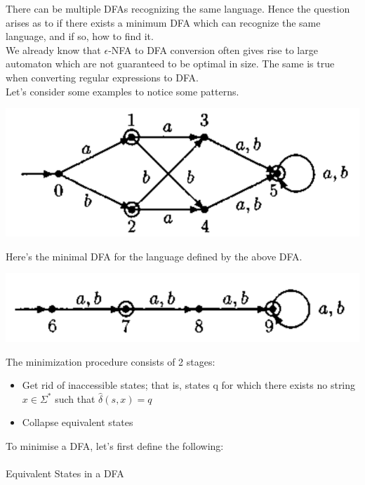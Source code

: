 \documentclass{report}
\newcommand{\dhat}{\hat{\delta}}
\begin{document}
There can be multiple DFAs recognizing the same language. Hence the question arises as to if there exists a minimum DFA which can recognize the same language, and if so, how to find it. \\
We already know that $\epsilon$-NFA to DFA conversion often gives rise to large automaton which are not guaranteed to be optimal in size. The same is true when converting regular expressions to DFA. \\

Let's consider some examples to notice some patterns.

\begin{center}
  \includegraphics[scale=0.5]{images/large-auto-1.png}
\end{center}

Here's the minimal DFA for the language defined by the above DFA.

\begin{center}
  \includegraphics[scale=0.5]{images/minimised-auto-1.png}
\end{center}

The minimization procedure consists of 2 stages:
\begin{itemize}
  \item Get rid of inaccessible states; that is, states q for which there exists no string $x \in \Sigma^*$ such that $\dhat(s,x) = q$
  \item Collapse equivalent states
\end{itemize}

To minimise a DFA, let's first define the following: \\\\

{\Large Equivalent States in a DFA} \\
\end{document}
